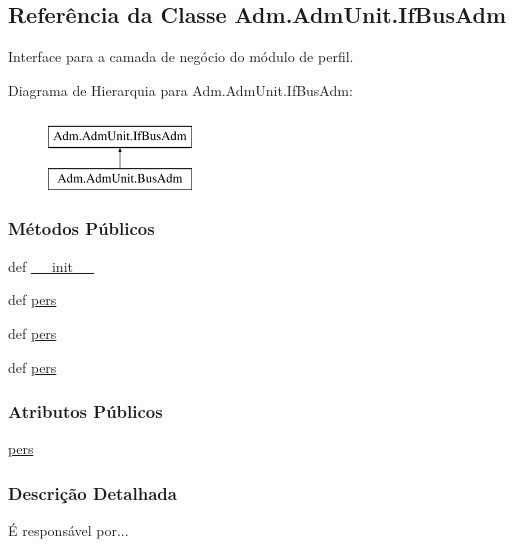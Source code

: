 \hypertarget{classAdm_1_1AdmUnit_1_1IfBusAdm}{\subsection{Referência da Classe Adm.\-Adm\-Unit.\-If\-Bus\-Adm}
\label{classAdm_1_1AdmUnit_1_1IfBusAdm}
}


Interface para a camada de negócio do módulo de perfil.  


Diagrama de Hierarquia para Adm.\-Adm\-Unit.\-If\-Bus\-Adm\-:\begin{figure}[H]
\begin{center}
\leavevmode
\includegraphics[height=2.000000cm]{d3/d53/classAdm_1_1AdmUnit_1_1IfBusAdm}
\end{center}
\end{figure}
\subsubsection*{Métodos Públicos}
\begin{DoxyCompactItemize}
\item 
def \hyperlink{classAdm_1_1AdmUnit_1_1IfBusAdm_abe924f0f983b1fe97ca466907d35c834}{\-\_\-\-\_\-init\-\_\-\-\_\-}
\item 
def \hyperlink{classAdm_1_1AdmUnit_1_1IfBusAdm_a31857b146085382c8d778ae90cd46c6f}{pers}
\item 
def \hyperlink{classAdm_1_1AdmUnit_1_1IfBusAdm_a31857b146085382c8d778ae90cd46c6f}{pers}
\item 
def \hyperlink{classAdm_1_1AdmUnit_1_1IfBusAdm_a31857b146085382c8d778ae90cd46c6f}{pers}
\end{DoxyCompactItemize}
\subsubsection*{Atributos Públicos}
\begin{DoxyCompactItemize}
\item 
\hyperlink{classAdm_1_1AdmUnit_1_1IfBusAdm_a95ea8f39fbbcddf44822e1614c712bfe}{pers}
\end{DoxyCompactItemize}


\subsubsection{Descrição Detalhada}
É responsável por... 

